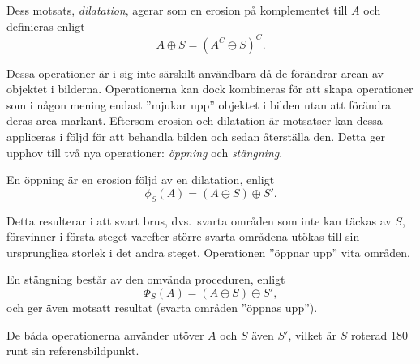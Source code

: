 \documentclass[../rapport_MVEX01-11-05]{subfiles}
\begin{document}
Dess motsats, \emph{dilatation}, agerar som
en erosion på komplementet till $A$ och definieras enligt
\begin{equation*}
  A\oplus S = (A^C\ominus S)^C.
\end{equation*}

Dessa operationer är i sig inte särskilt användbara då de förändrar
arean av objektet i bilderna. Operationerna kan dock kombineras för
att skapa operationer som i någon mening endast 
''mjukar upp'' objektet i bilden utan att förändra deras area markant.
Eftersom erosion och dilatation är motsatser kan dessa appliceras i
följd för att behandla bilden och
sedan återställa den. Detta ger upphov till två nya operationer:
\emph{öppning} och \emph{stängning}.

En öppning är en erosion följd av en dilatation, enligt
\begin{equation*}
  \phi_S(A)=(A\ominus S)\oplus S'.
\end{equation*}

Detta resulterar i att svart brus, dvs.~svarta områden som inte kan täckas
av $S$, försvinner i
första steget varefter större svarta områdena utökas till sin ursprungliga
storlek i det andra
steget. Operationen ''öppnar upp'' vita områden.

En stängning består av den omvända proceduren, enligt
\begin{equation*}
  \Phi_S(A)=(A\oplus S)\ominus S',
\end{equation*}
och ger även motsatt resultat (svarta områden ''öppnas upp'').

De
båda operationerna använder utöver $A$ och $S$ även $S'$, vilket är
$S$ roterad 180\textdegree{} runt sin referensbildpunkt.
\end{document}

